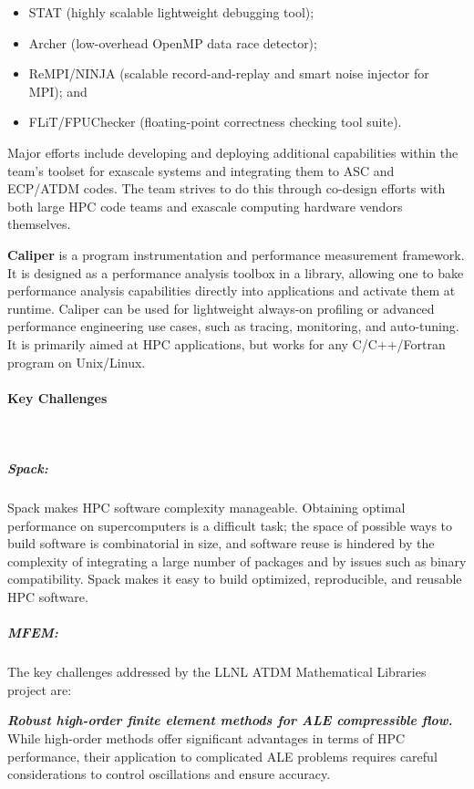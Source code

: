 \begin{itemize}
\item STAT (highly scalable lightweight debugging tool);
\item Archer (low-overhead OpenMP data race detector);
\item ReMPI/NINJA (scalable record-and-replay and smart noise injector for MPI); and
\item FLiT/FPUChecker (floating-point correctness checking tool suite).
\end{itemize}

Major efforts include developing and deploying additional capabilities
within the team’s toolset for exascale systems and integrating them to
ASC and ECP/ATDM codes. The team strives to do this through co-design
efforts with both large HPC code teams and exascale computing hardware
vendors themselves.

\textbf{Caliper} is a program instrumentation and performance measurement
framework. It is designed as a performance analysis toolbox in a library,
allowing one to bake performance analysis capabilities directly into
applications and activate them at runtime. Caliper can be used for
lightweight always-on profiling or advanced performance engineering use
cases, such as tracing, monitoring, and auto-tuning. It is primarily
aimed at HPC applications, but works for any C/C++/Fortran program on
Unix/Linux.


\paragraph{Key  Challenges} \leavevmode \\

\subparagraph{Spack:}
Spack makes HPC software complexity manageable. Obtaining optimal
performance on supercomputers is a difficult task; the space of possible
ways to build software is combinatorial in size, and software reuse is
hindered by the complexity of integrating a large number of packages and
by issues such as binary compatibility.  Spack makes it easy to build
optimized, reproducible, and reusable HPC software.

\subparagraph{MFEM:}
The key challenges addressed by the LLNL ATDM Mathematical Libraries project are:

\noindent
{\bf \em Robust high-order finite element methods for ALE compressible flow.}
While high-order methods offer significant advantages in terms of HPC performance,
their application to complicated ALE problems requires careful considerations to
control oscillations and ensure accuracy.


